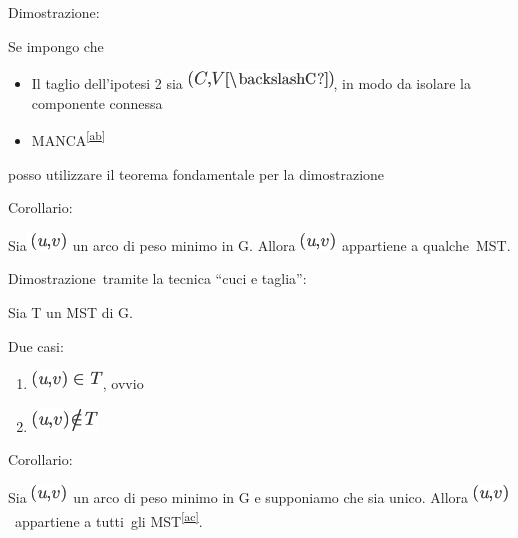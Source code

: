 \documentclass{article}
\providecommand{\tightlist}{%
  \setlength{\itemsep}{0pt}\setlength{\parskip}{0pt}}
\begin{document}
{}

{Dimostrazione:}

{Se impongo che}

\begin{itemize}
\tightlist
\item
  {Il taglio dell'ipotesi 2 sia }\includegraphics{images/image467.png}{,
  in modo da isolare la componente connessa}
\item
  {MANCA}\textsuperscript{\protect\hyperlink{cmnt28}{{[}ab{]}}}
\end{itemize}

{posso utilizzare il teorema fondamentale per la dimostrazione}

{}

{Corollario}{:}

{Sia}\includegraphics{images/image468.png}{~un arco di peso minimo in G.
Allora }\includegraphics{images/image449.png}{~appartiene }{a
qualche}{~MST.}

{Dimostrazione}{~tramite la tecnica ``cuci e taglia'':}

{Sia T un MST di G. }

{Due casi:}

\begin{enumerate}
\tightlist
\item
  \includegraphics{images/image452.png}{, ovvio}
\item
  \includegraphics{images/image454.png}
\end{enumerate}

{}

{Corollario}{:}

{Sia }\includegraphics{images/image449.png}{~un arco di peso minimo in G
e supponiamo che sia unico. Allora
}\includegraphics{images/image449.png}{~appartiene }{a tutti}{~gli
MST}\textsuperscript{\protect\hyperlink{cmnt29}{{[}ac{]}}}{.}
\end{document}
